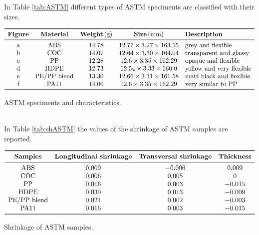 \documentclass[a4paper, 11pt]{article}
\begin{document}
In Table \ref{tab:ASTM} different types of ASTM speciments are classified with their sizes.
\begin{table}[htp]
\centering
$
\begin{array}{ccccl}
\toprule
\textbf{Figure} & \textbf{Material} & \textbf{Weight}\,(\text{g}) & \textbf{Size}\,(\text{mm}) & \textbf{Description} \\
\midrule
\text{a} & \text{ABS} & 14.78 & 12.77\times 3.27\times 163.55 & \text{grey and flexible}\\
\text{b} & \text{COC} & 14.07 & 12.64\times 3.30\times 164.04 & \text{transparent and glassy}\\
\text{c} & \text{PP} & 12.28 & 12.6\times 3.35\times 162.29 & \text{opaque and flexible} \\
\text{d} & \text{HDPE} & 12.73 & 12.54\times 3.33\times 160.0 & \text{yellow and very flexible} \\
\text{e} & \text{PE/PP}\ \text{blend} & 13.30 & 12.66\times 3.31\times 161.58 & \text{matt black and flexible} \\
\text{f} & \text{PA11} & 14.00 & 12.6\times 3.35\times 162.29 & \text{very similar to PP} \\
\bottomrule
\end{array}
$
\caption{ASTM speciments and characteristics.}
\label{tab:ASTM}
\end{table}
\\

In Table \ref{tab:shASTM} the values of the shrinkage of ASTM samples are reported.

\begin{table}[htp]
\centering
$
\begin{array}{cccc}
\toprule
\textbf{Samples} & \textbf{Longitudinal shrinkage} & \textbf{Transversal shrinkage} & \textbf{Thickness} \\
\midrule
\text{ABS} & 0.009 & -0.006 & 0.009  \\
\text{COC} & 0.006 & 0.005 & 0 \\
\text{PP} & 0.016 & 0.003& -0.015 \\
\text{HDPE} & 0.030 & 0.013 & -0.009 \\
\text{PE/PP blend} & 0.021 & 0.002 & -0.003 \\
\text{PA11} & 0.016 & 0.003& -0.015 \\
\bottomrule
\end{array}
$
\caption{Shrinkage of ASTM samples.}
\label{tab:shASTM}
\end{table}
\end{document}
